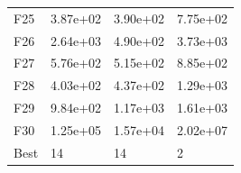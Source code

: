 \begin{table}[H]
\begin{minipage}{.5\linewidth}
\begin{tabular}{llll}
            F25  &  3.87e+02 &  3.90e+02 &  7.75e+02 \\
            F26  &  2.64e+03 &  4.90e+02 &  3.73e+03 \\
            F27  &  5.76e+02 &  5.15e+02 &  8.85e+02 \\
            F28  &  4.03e+02 &  4.37e+02 &  1.29e+03 \\
            F29  &  9.84e+02 &  1.17e+03 &  1.61e+03 \\
            F30  &  1.25e+05 &  1.57e+04 &  2.02e+07 \\
            Best &        14 &        14 &         2 \\
            \bottomrule
            \end{tabular}
            
    \end{minipage} 
\end{table}


